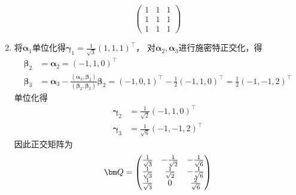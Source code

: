 \begin{solution}
\begin{enumerate}[(1)]
\[\begin{pmatrix}
                      1 & 1 & 1 \\
                      1 & 1 & 1 \\
                      1 & 1 & 1
                  \end{pmatrix}
              \]
        \item 将$\bm{\alpha}_1$单位化得$\bm{\gamma}_1 = \frac{1}{\sqrt{3}}(1,1,1)^\intercal$，
              对$\bm{\alpha}_2,\bm{\alpha}_3$进行施密特正交化，得
              \begin{align*}
                  \bm{\beta}_2 & = \bm{\alpha}_2 = (-1,1,0)^\intercal                                                           \\
                  \bm{\beta}_3 & = \bm{\alpha}_3 - \frac{(\bm{\alpha}_3,\bm{\beta}_2)}{(\bm{\beta}_2,\bm{\beta}_2)}\bm{\beta}_2
                  = (-1,0,1)^\intercal - \frac{1}{2}(-1,1,0)^\intercal = \frac{1}{2}(-1,-1,2)^\intercal
              \end{align*}
              单位化得
              \begin{align*}
                  \bm{\gamma}_2 & = \frac{1}{\sqrt{2}}(-1,1,0)^\intercal  \\
                  \bm{\gamma}_3 & = \frac{1}{\sqrt{6}}(-1,-1,2)^\intercal
              \end{align*}
              因此正交矩阵为
              \[
                  \mat{Q} =
                  \begin{pmatrix}
                      \frac{1}{\sqrt{3}} & -\frac{1}{\sqrt{2}} & -\frac{1}{\sqrt{6}} \\
                      \frac{1}{\sqrt{3}} & \frac{1}{\sqrt{2}}  & -\frac{1}{\sqrt{6}} \\
                      \frac{1}{\sqrt{3}} & 0                   & \frac{2}{\sqrt{6}}
                  \end{pmatrix}
              \]
    \end{enumerate}
\end{solution}

